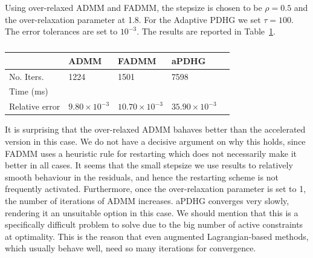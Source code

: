 \documentclass[openany]{now}
\begin{document}
Using over-relaxed ADMM and FADMM, the stepsize is chosen to be $\rho=0.5$ and the over-relaxation parameter at 1.8. For the Adaptive PDHG we set $\tau=100$. The error tolerances are set to $10^{-3}$. The results are reported in Table~\ref{table:soft-landing}.
\begin{table}[t]
  \centering
    \begin{tabular}{ | p{1.5cm} | p{2.5cm} | p{1.5cm} | p{1.5cm} | p{1.5cm} |}
    \hline
     & ADMM & FADMM & aPDHG \\ \hline
     No. Iters. & 1224  & 1501 & 7598\\ \hline
     Time (ms) &  &  &  \\ \hline
     Relative error & $9.80\times10^{-3}$ & $10.70\times10^{-3}$ & $35.90\times10^{-3}$\\ \hline\hline
    \end{tabular}
    \caption{}
    {\label{table:soft-landing}}
\end{table}
It is surprising that the over-relaxed ADMM bahaves better than the accelerated version in this case. We do not have a decisive argument on why this holds, since FADMM uses a heuristic rule for restarting which does not necessarily make it better in all cases. It seems that the small stepsize we use results to relatively smooth behaviour in the residuals, and hence the restarting scheme is not frequently activated. Furthermore, once the over-relaxation parameter is set to 1, the number of iterations of ADMM increases. 
aPDHG converges very slowly, rendering it an unsuitable option in this case. We should mention that this is a specifically difficult problem to solve due to the big number of active constraints at optimality. This is the reason that even augmented Lagrangian-based methods, which usually behave well, need so many iterations for convergence.
\end{document}

